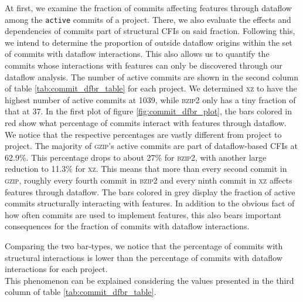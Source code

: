 At first, we examine the fraction of commits affecting features through dataflow among the \texttt{active} commits of a project.
There, we also evaluate the effects and dependencies of commits part of structural CFIs on said fraction.
Following this, we intend to determine the proportion of outside dataflow origins within the set of commits with dataflow interactions.
This also allows us to quantify the commits whose interactions with features can only be discovered through our dataflow analysis.
The number of active commits are shown in the second column of table \ref{tab:commit_dfbr_table} for each project.
We determined \textsc{xz} to have the highest number of active commits at 1039, while \textsc{bzip2} only has a tiny fraction of that at 37.
In the first plot of figure \ref{fig:commit_dfbr_plot}, the bars colored in red show what percentage of commits interact with features through dataflow.
We notice that the respective percentages are vastly different from project to project.
The majority of \textsc{gzip}'s active commits are part of dataflow-based CFIs at 62.9\%.
This percentage drops to about 27\% for \textsc{bzip2}, with another large reduction to 11.3\% for \textsc{xz}.
This means that more than every second commit in \textsc{gzip}, roughly every fourth commit in \textsc{bzip2} and every ninth commit in \textsc{xz} affects features through dataflow.
The bars colored in grey display the fraction of active commits structurally interacting with features.
In addition to the obvious fact of how often commits are used to implement features, this also bears important consequences for the fraction of commits with dataflow interactions.
\iffalse
The more commits are part of structural CFIs, the more of the code contributed by them and therefore the overall code of a project will be part of feature regions.
Logically, the accuracy of this estimation depends on many factors, such as the extend to which commits contributing code to features, also contribute code to other parts of a program.
Still, given the large disparity in the percentage of commits with structural interactions, we can be relatively certain that \textsc{xz} has the lowest proportion and \textsc{gzip} the largest proportion of feature-code with \textsc{bzip2} somewhere inbetween.
\fi
Comparing the two bar-types, we notice that the percentage of commits with structural interactions is lower than the percentage of commits with dataflow interactions for each project. \\
This phenomenon can be explained considering the values presented in the third column of table \ref{tab:commit_dfbr_table}.
